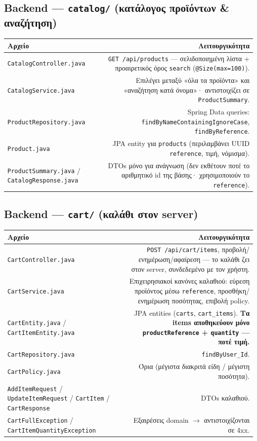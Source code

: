 \documentclass[11pt,a4paper]{article}
\newcommand{\code}[1]{\texttt{#1}}
\begin{document}
\subsection{Backend --- \texttt{catalog/} (κατάλογος προϊόντων \& αναζήτηση)}
\begin{longtable}{@{}L R@{}}
    \toprule
    \textbf{Αρχείο} & \textbf{Λειτουργικότητα} \\
    \midrule
    \code{CatalogController.java} & \code{GET /api/products} --- σελιδοποιημένη λίστα + προαιρετικός όρος \code{search} (\code{@Size(max=100)}). \\
    \code{CatalogService.java} & Επιλέγει μεταξύ «όλα τα προϊόντα» και «αναζήτηση κατά όνομα»· αντιστοιχίζει σε \code{ProductSummary}. \\
    \code{ProductRepository.\allowbreak{}java} & Spring Data queries: \code{findBy\allowbreak{}Name\allowbreak{}Containing\allowbreak{}IgnoreCase}, \code{findByReference}. \\
    \code{Product.java} & JPA entity για \code{products} (περιλαμβάνει UUID \code{reference}, τιμή, νόμισμα). \\
    \code{ProductSummary.java} / \code{CatalogResponse.java} & DTOs μόνο για ανάγνωση (δεν εκθέτουν ποτέ το αριθμητικό id της βάσης· χρησιμοποιούν το \code{reference}). \\
    \bottomrule
\end{longtable}

\subsection{Backend --- \texttt{cart/} (καλάθι στον server)}
\begin{longtable}{@{}L R@{}}
    \toprule
    \textbf{Αρχείο} & \textbf{Λειτουργικότητα} \\
    \midrule
    \code{CartController.java} & \code{POST /api/cart/items}, προβολή/ενημέρωση/αφαίρεση --- το καλάθι ζει στον server, συνδεδεμένο με τον χρήστη. \\
    \code{CartService.java} & Επιχειρησιακοί κανόνες καλαθιού: εύρεση προϊόντος μέσω \code{reference}, προσθήκη/ενημέρωση ποσότητας, επιβολή policy. \\
    \code{CartEntity.java} / \code{CartItemEntity.java} & JPA entities (\code{carts}, \code{cart\_items}). \textbf{Τα items αποθηκεύουν μόνο \code{productReference} + \code{quantity} --- ποτέ τιμή.} \\
    \code{CartRepository.\allowbreak{}java} & \code{findByUser\_Id}. \\
    \code{CartPolicy.java} & Όρια (μέγιστα διακριτά είδη / μέγιστη ποσότητα). \\
    \code{AddItemRequest} / \code{UpdateItemRequest} / \code{CartItem} / \code{CartResponse} & DTOs καλαθιού. \\
    \code{CartFullException} / \code{CartItemQuantityException} & Εξαιρέσεις domain $\rightarrow$ αντιστοιχίζονται σε 4xx. \\
    \bottomrule
\end{longtable}
\end{document}

